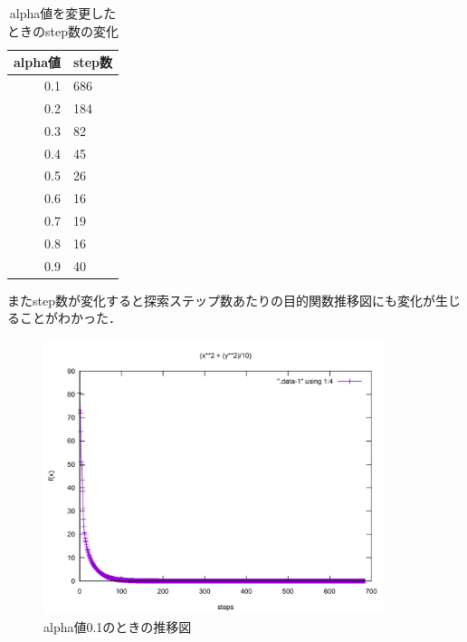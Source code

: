 \begin{table}[htb]
 \begin{center}
  \caption{alpha値を変更したときのstep数の変化}
  \label{table:level3}
  \begin{tabular}[htb]{r|l} \hline
   alpha値 &  step数\\ \hline \hline
   0.1 &  686\\ \hline
   0.2 & 184 \\ \hline
   0.3 & 82 \\ \hline
   0.4 & 45 \\ \hline
   0.5 & 26 \\ \hline
   0.6 & 16 \\ \hline
   0.7 & 19 \\ \hline
   0.8 & 16 \\ \hline
   0.9 & 40 \\ \hline \hline

  \end{tabular}
 \end{center}
\end{table}


またstep数が変化すると探索ステップ数あたりの目的関数推移図にも変化が生じることがわかった．\\

\begin{figure}[ht]
 \begin{center}
  \includegraphics[width=10.0cm]{figs/level2.2/sim-1-2.pdf}
  \caption{alpha値0.1のときの推移図}
	\label{step_alpha}
 \end{center}
\end{figure}

